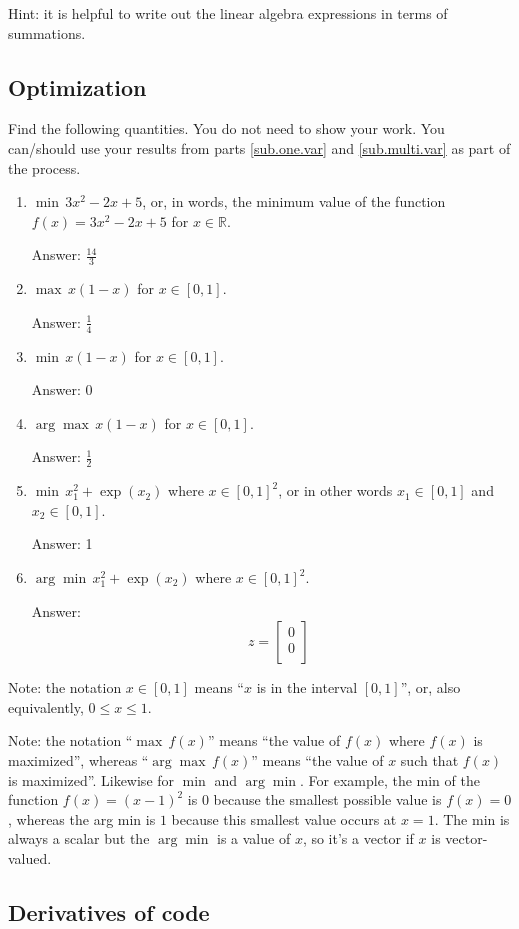 \documentclass{article}
\def\ans#1{\par\gre{Answer: #1}}
\def\blu#1{{\color{blu}#1}}
\def\gre#1{{\color{gre}#1}}
\def\R{\mathbb{R}}
\begin{document}
Hint: it is helpful to write out the linear algebra expressions in terms of summations.


\subsection{Optimization}
\blu{Find the following quantities.} You do not need to show your work. 
You can/should use your results from parts \ref{sub.one.var} and \ref{sub.multi.var} as part of the process.

\begin{enumerate}
\item $\min \, 3x^2-2x+5$, or, in words, the minimum value of the function $f(x) = 3x^2 -2x + 5$ for $x \in \R$.
 \ans{$\frac{14}{3}$}
\item $\max \, x(1-x)$ for $x\in [0,1]$.
 \ans{$\frac{1}{4}$}
\item $\min \, x(1-x)$ for $x\in [0,1]$.
 \ans{0}
\item $\arg \max \, x(1-x)$ for $x\in[0,1]$. 
 \ans{$\frac{1}{2}$}
\item $\min \, x_1^2 + \exp(x_2)$ where $x \in [0,1]^2$, or in other words $x_1\in [0,1]$ and $x_2\in [0,1]$.
 \ans{1}
\item $\arg \min \, x_1^2 + \exp(x_2)$ where $x \in [0,1]^2$. 
\ans{\[\quad
	z = \left[\begin{array}{c}
	0\\
	0\\
	\end{array}\right]\]}
\end{enumerate}

Note: the notation $x\in [0,1]$ means ``$x$ is in the interval $[0,1]$'', or, also equivalently, $0 \leq x \leq 1$.

Note: the notation ``$\max \, f(x)$'' means ``the value of $f(x)$ where $f(x)$ is maximized'', whereas ``$\arg \max \, f(x)$'' means ``the value of $x$ such that $f(x)$ is maximized''.
Likewise for $\min$ and $\arg \min$. For example, the min of the function $f(x)=(x-1)^2$ is $0$ because the smallest possible value is $f(x)=0$, 
whereas the arg min is $1$ because this smallest value occurs at $x=1$. The min is always a scalar but the $\arg \min$ is a value of $x$, so it's a vector 
if $x$ is vector-valued.

\subsection{Derivatives of code}
\end{document}
